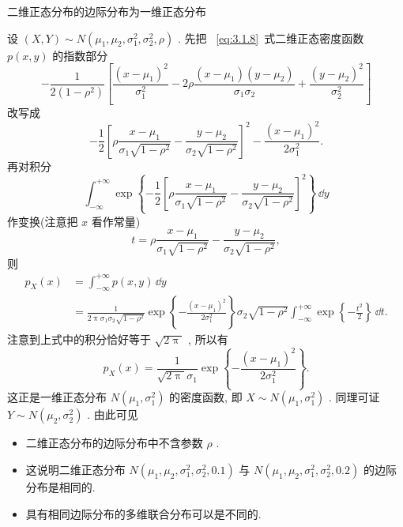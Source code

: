   \begin{example}\label{exam:3.2.5}
  	二维正态分布的边际分布为一维正态分布
  \end{example}
  \begin{solution}
  	设 $(X,Y)\sim N(\mu_1,\mu_2,\sigma_1^2,\sigma_2^2,\rho)$ . 先把 ~\eqref{eq:3.1.8}~式二维正态密度函数 $p(x,y)$ 的指数部分
  	\begin{equation*}
  	-\frac{1}{2(1-\rho^2)}\left[\frac{(x-\mu_1)^2}{\sigma_1^2}-2\rho\frac{(x-\mu_1)(y-\mu_2)}{\sigma_1\sigma_2}+\frac{(y-\mu_2)^2}{\sigma_2^2}\right]
  	\end{equation*}
  	改写成
  	\begin{equation*}
  	-\frac{1}{2}\left[\rho\frac{x-\mu_1}{\sigma_1\sqrt{1-\rho^2}}-\frac{y-\mu_2}{\sigma_2\sqrt{1-\rho^2}}\right]^2-\frac{(x-\mu_1)^2}{2\sigma_1^2}.
  	\end{equation*}
  	再对积分
  	\begin{equation*}
  	\int_{-\infty}^{+\infty}\exp\left\{-\frac{1}{2}\left[\rho\frac{x-\mu_1}{\sigma_1\sqrt{1-\rho^2}}-\frac{y-\mu_2}{\sigma_2\sqrt{1-\rho^2}}\right]^2\right\}\,\dd y
  	\end{equation*}
  	作变换(注意把 $x$ 看作常量)
  	\begin{equation*}
  	t=\rho\frac{x-\mu_1}{\sigma_1\sqrt{1-\rho^2}}-\frac{y-\mu_2}{\sigma_2\sqrt{1-\rho^2}},
  	\end{equation*}
  	则
  	\begin{align*}
  	p_{X}(x) &= \int_{-\infty}^{+\infty}p(x,y)\,\dd y\\
  	&=\frac{1}{2\uppi\sigma_1\sigma_2\sqrt{1-\rho^2}}\exp\left\{-\frac{(x-\mu_1)^2}{2\sigma_1^2}\right\}\sigma_2\sqrt{1-\rho^2}\int_{-\infty}^{+\infty}\exp\left\{-\frac{t^2}{2}\right\}\,\dd t.
  	\end{align*}
  	注意到上式中的积分恰好等于 $\sqrt{2\uppi}$ , 所以有
  	\begin{equation*}
  	p_{X}(x)=\frac{1}{\sqrt{2\uppi}\sigma_1}\exp\left\{-\frac{(x-\mu_1)^2}{2\sigma_1^2}\right\}.
  	\end{equation*}
  	这正是一维正态分布 $N(\mu_1,\sigma_1^2)$ 的密度函数, 即 $X\sim N(\mu_1,\sigma_1^2)$ . 同理可证 $Y\sim N(\mu_2,\sigma_2^2)$ . 由此可见
  	\begin{itemize}
  		\item 二维正态分布的边际分布中不含参数 $\rho$ .
  		\item 这说明二维正态分布 $N(\mu_1,\mu_2,\sigma_1^2,\sigma_2^2,0.1)$ 与 $N(\mu_1,\mu_2,\sigma_1^2,\sigma_2^2,0.2)$ 的边际分布是相同的.
  		\item 具有相同边际分布的多维联合分布可以是不同的.
  	\end{itemize}
  \end{solution}
  
